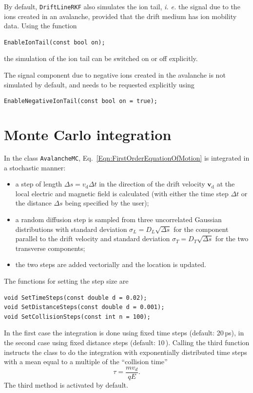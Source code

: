 By default, \texttt{DriftLineRKF} also simulates the ion tail, \textit{i. e.} the signal due to the ions created in an avalanche, provided that the drift medium has ion mobility data.
Using the function
\begin{lstlisting}
EnableIonTail(const bool on);
\end{lstlisting}
the simulation of the ion tail can be switched on or off explicitly.

The signal component due to negative ions created in the avalanche is not simulated by default, and needs to be requested explicitly using
\begin{lstlisting}
EnableNegativeIonTail(const bool on = true);
\end{lstlisting}

\section{Monte Carlo integration}\label{Sec:DriftLineMC}
In the class \texttt{AvalancheMC}, Eq.~\eqref{Eqn:FirstOrderEquationOfMotion}
is integrated in a stochastic manner:
\begin{itemize}
  \item
  a step of length \(\Delta{s} = v_{\text{d}}\Delta{t}\) 
  in the direction of the
  drift velocity \(\mathbf{v}_{\text{d}}\) 
  at the local electric and magnetic field is calculated (with either the 
  time step \(\Delta{t}\) or the distance \(\Delta{s}\) 
  being specified by the user);
  \item
   a random diffusion step
   is sampled from three uncorrelated Gaussian distributions
   with standard deviation \(\sigma_{L} = D_{L}\sqrt{\Delta{s}}\)
   for the component parallel to the drift velocity and
   standard deviation
   \(\sigma_{T} = D_{T}\sqrt{\Delta{s}}\) for the two
   transverse components;
   \item
   the two steps are added vectorially and the location is updated.
\end{itemize}
The functions for setting the step size are 
\begin{lstlisting}
void SetTimeSteps(const double d = 0.02);
void SetDistanceSteps(const double d = 0.001);
void SetCollisionSteps(const int n = 100);
\end{lstlisting} 
In the first case the integration is done 
using fixed time steps (default: 20\,ps), 
in the second case using fixed distance steps (default: 10\,). 
Calling the third function instructs the class to 
do the integration with exponentially distributed time steps 
with a mean equal to a multiple of the ``collision time'' 
\begin{equation*}
  \tau = \frac{m v_{d}}{q E}.
\end{equation*}
The third method is activated by default. 

